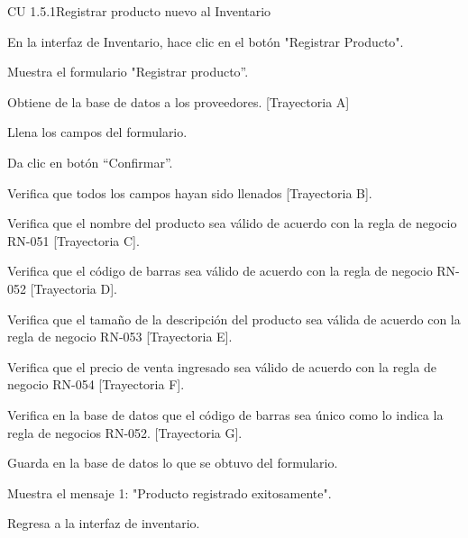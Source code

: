 \begin{UseCase}{CU 1.5.1}{Registrar producto nuevo al Inventario}
\end{UseCase}

\begin{UCtrayectoria}
	
	\UCpaso[\UCactor] En la interfaz de Inventario, hace clic en el botón "Registrar Producto".
	
	\UCpaso[\UCsist] Muestra el formulario "Registrar producto”.

	\UCpaso[\UCsist] Obtiene de la base de datos a los proveedores. [Trayectoria A]
	
	\UCpaso[\UCactor] Llena los campos del formulario.
	
	\UCpaso[\UCactor] Da clic en botón “Confirmar”.

	\UCpaso[\UCsist] Verifica que todos los campos hayan sido llenados [Trayectoria B].

	\UCpaso[\UCsist] Verifica que el nombre del producto sea válido de acuerdo con la regla de negocio RN-051 [Trayectoria C].

	\UCpaso[\UCsist] Verifica que el código de barras sea válido de acuerdo con la regla de negocio RN-052 [Trayectoria D].

	\UCpaso[\UCsist] Verifica que el tamaño de la descripción del producto sea válida de acuerdo con la regla de negocio RN-053 [Trayectoria E].

	\UCpaso[\UCsist] Verifica que el precio de venta ingresado sea válido de acuerdo con la regla de negocio RN-054 [Trayectoria F].

	\UCpaso[\UCsist] Verifica en la base de datos que el código de barras sea único como lo indica la regla de negocios RN-052. [Trayectoria G].
	
	\UCpaso[\UCsist] Guarda en la base de datos lo que se obtuvo del formulario.

	\UCpaso[\UCsist] Muestra el mensaje 1: "Producto registrado exitosamente".

	\UCpaso[] Regresa a la interfaz de inventario.
	
\end{UCtrayectoria}


